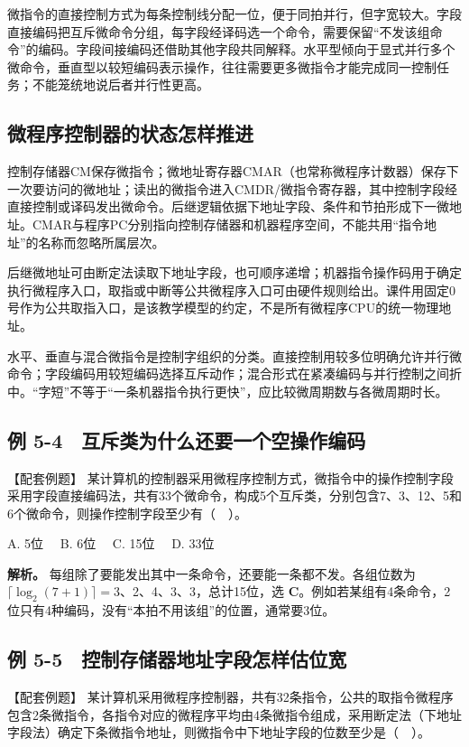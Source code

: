 微指令的直接控制方式为每条控制线分配一位，便于同拍并行，但字宽较大。字段直接编码把互斥微命令分组，每字段经译码选一个命令，需要保留``不发该组命令''的编码。字段间接编码还借助其他字段共同解释。水平型倾向于显式并行多个微命令，垂直型以较短编码表示操作，往往需要更多微指令才能完成同一控制任务；不能笼统地说后者并行性更高。

\subsection{微程序控制器的状态怎样推进}\label{CO05-microsequence}

控制存储器CM保存微指令；微地址寄存器CMAR（也常称微程序计数器）保存下一次要访问的微地址；读出的微指令进入CMDR/微指令寄存器，其中控制字段经直接控制或译码发出微命令。后继逻辑依据下地址字段、条件和节拍形成下一微地址。CMAR与程序PC分别指向控制存储器和机器程序空间，不能共用``指令地址''的名称而忽略所属层次。

后继微地址可由断定法读取下地址字段，也可顺序递增；机器指令操作码用于确定执行微程序入口，取指或中断等公共微程序入口可由硬件规则给出。课件用固定0号作为公共取指入口，是该教学模型的约定，不是所有微程序CPU的统一物理地址。

水平、垂直与混合微指令是控制字组织的分类。直接控制用较多位明确允许并行微命令；字段编码用较短编码选择互斥动作；混合形式在紧凑编码与并行控制之间折中。``字短''不等于``一条机器指令执行更快''，应比较微周期数与各微周期时长。

\subsection{例 5-4　互斥类为什么还要一个空操作编码}\label{CO05-example-4}

【配套例题】 某计算机的控制器采用微程序控制方式，微指令中的操作控制字段采用字段直接编码法，共有33个微命令，构成5个互斥类，分别包含7、3、12、5和6个微命令，则操作控制字段至少有（　）。

A. 5位　 B. 6位　 C. 15位　 D. 33位

\textbf{解析。} 每组除了要能发出其中一条命令，还要能一条都不发。各组位数为 \(\lceil\log_2(7+1)\rceil=3\)、2、4、3、3，总计15位，选 \textbf{C}。例如若某组有4条命令，2位只有4种编码，没有``本拍不用该组''的位置，通常要3位。

\subsection{例 5-5　控制存储器地址字段怎样估位宽}\label{CO05-example-5}

【配套例题】 某计算机采用微程序控制器，共有32条指令，公共的取指令微程序包含2条微指令，各指令对应的微程序平均由4条微指令组成，采用断定法（下地址字段法）确定下条微指令地址，则微指令中下地址字段的位数至少是（　）。

